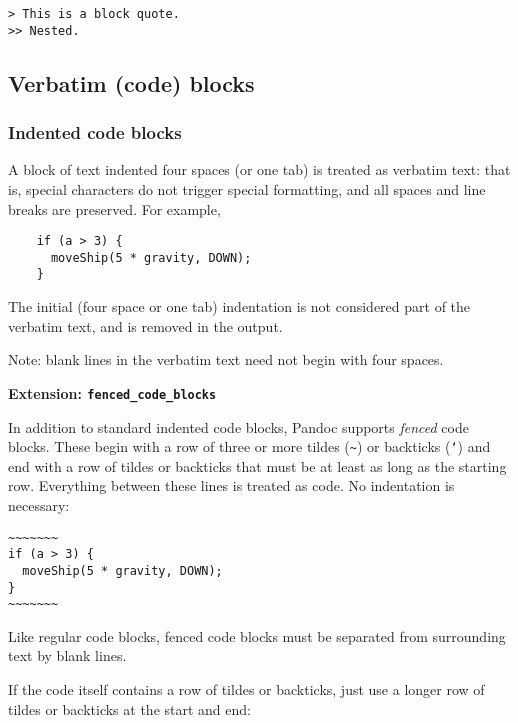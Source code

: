 \documentclass[]{article}
\begin{document}
\begin{verbatim}
> This is a block quote.
>> Nested.
\end{verbatim}

\subsection{Verbatim (code) blocks}

\subsubsection{Indented code blocks}

A block of text indented four spaces (or one tab) is treated as verbatim
text: that is, special characters do not trigger special formatting, and
all spaces and line breaks are preserved. For example,

\begin{verbatim}
    if (a > 3) {
      moveShip(5 * gravity, DOWN);
    }
\end{verbatim}

The initial (four space or one tab) indentation is not considered part
of the verbatim text, and is removed in the output.

Note: blank lines in the verbatim text need not begin with four spaces.


\textbf{Extension: \texttt{fenced\_code\_blocks}}

In addition to standard indented code blocks, Pandoc supports
\emph{fenced} code blocks. These begin with a row of three or more
tildes (\texttt{\textasciitilde{}}) or backticks (\texttt{`}) and end
with a row of tildes or backticks that must be at least as long as the
starting row. Everything between these lines is treated as code. No
indentation is necessary:

\begin{verbatim}
~~~~~~~
if (a > 3) {
  moveShip(5 * gravity, DOWN);
}
~~~~~~~
\end{verbatim}

Like regular code blocks, fenced code blocks must be separated from
surrounding text by blank lines.

If the code itself contains a row of tildes or backticks, just use a
longer row of tildes or backticks at the start and end:
\end{document}
